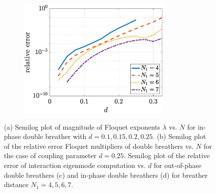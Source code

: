 \documentclass[12pt,reqno]{amsart}
\theoremstyle{definition}
\begin{document}
\begin{figure}
\begin{center}
\begin{subfigure}{0.45\linewidth}
		\caption{}
		\includegraphics[width=7.5cm]{doubleppeigerrord.eps} \hspace{-0.5cm}
		\label{fig:eigerrord} 
	\end{subfigure}
	\end{center}
	\caption{(a) Semilog plot of magnitude of Floquet exponents $\lambda$ vs. $N$ for in-phase double breather with $d = 0.1, 0.15, 0.2, 0.25$. (b) Semilog plot of the relative error Floquet multipliers of double breathers vs. $N$ for the case of 
	coupling parameter $d = 0.25$.
	Semilog plot of the relative error of interaction eigenmode computation vs. $d$ for out-of-phase double breathers (c) and in-phase double breathers (d) for breather distance $N_1 = 4,5,6,7$.}
	\label{fig:eigerror}
\end{figure}
\end{document}
